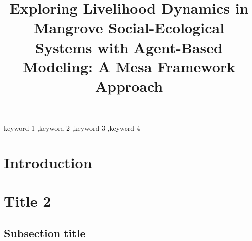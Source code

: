 \documentclass[final,5p,times,twocolumn,authoryear]{elsarticle}
\begin{document}
\begin{frontmatter}

\title{Exploring Livelihood Dynamics in Mangrove Social-Ecological Systems with Agent-Based Modeling: A Mesa Framework Approach}




\address[1]{Bangladesh University of Engineering and Technology, Dhaka, Bangladesh}
\begin{abstract}

\end{abstract}



\begin{keyword}
keyword 1 \sep keyword 2 \sep keyword 3 \sep keyword 4



\end{keyword}


\end{frontmatter}



\section{Introduction}
\label{introduction}



\section{Title 2}


\subsection{Subsection title}
\end{document}
